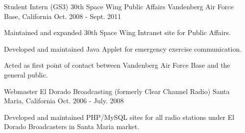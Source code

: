 \begin{cventries}
  \cventry
    {Student Intern (GS3)} %
    {30th Space Wing Public Affairs} %
    {Vandenberg Air Force Base, California} %
    {Oct. 2008 - Sept. 2011} %
    {
      \begin{cvitems} %
        \item {Maintained and expanded 30th Space Wing Intranet site for Public Affairs.}
        \item {Developed and maintained Java Applet for emergency exercise communication.}
        \item {Acted as first point of contact between Vandenberg Air Force Base and the general public.}
      \end{cvitems}
    }

  \cventry
    {Webmaster} %
    {El Dorado Broadcasting (formerly Clear Channel Radio)} %
    {Santa Maria, California} %
    {Oct. 2006 - July. 2008} %
    {
      \begin{cvitems} %
        \item {Developed and maintained PHP/MySQL sites for all radio stations under El Dorado Broadcasters in Santa Maria market.}
      \end{cvitems}
    }





\end{cventries}
